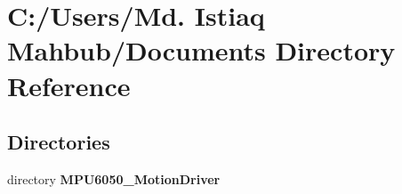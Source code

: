 \section{C\+:/\+Users/\+Md. Istiaq Mahbub/\+Documents Directory Reference}
\label{dir_decd9db6e1c42de2fd5319f16c42e107}
\subsection*{Directories}
\begin{DoxyCompactItemize}
\item 
directory \textbf{ M\+P\+U6050\+\_\+\+Motion\+Driver}
\end{DoxyCompactItemize}
